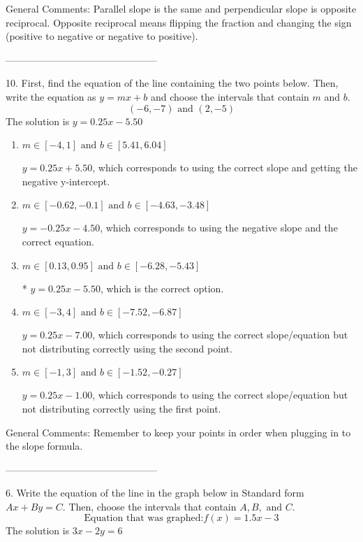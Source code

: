\documentclass{article}[14pt]
\begin{document}
General Comments: Parallel slope is the same and perpendicular slope is opposite reciprocal. Opposite reciprocal means flipping the fraction and changing the sign (positive to negative or negative to positive).

-----------------------------------------------

10. First, find the equation of the line containing the two points below. Then, write the equation as $ y=mx+b $ and choose the intervals that contain $m$ and $b$.
$$ (-6, -7) \text{ and } (2, -5) $$ 
The solution is $ y = 0.25x - 5.50 $ 

\begin{enumerate}[label=\Alph*.] 
\item $ m \in [-4, 1] \text{ and } b \in [5.41, 6.04] $ 

  $y = 0.25x + 5.50$, which corresponds to using the correct slope and getting the negative y-intercept. 
\item $ m \in [-0.62, -0.1] \text{ and } b \in [-4.63, -3.48] $ 

  $y = -0.25x - 4.50$, which corresponds to using the negative slope and the correct equation. 
\item $ m \in [0.13, 0.95] \text{ and } b \in [-6.28, -5.43] $ 

 * $y = 0.25x - 5.50$, which is the correct option. 
\item $ m \in [-3, 4] \text{ and } b \in [-7.52, -6.87] $ 

  $y = 0.25x - 7.00$, which corresponds to using the correct slope/equation but not distributing correctly using the second point. 
\item $ m \in [-1, 3] \text{ and } b \in [-1.52, -0.27] $ 

  $y = 0.25x - 1.00$, which corresponds to using the correct slope/equation but not distributing correctly using the first point. 
\end{enumerate} 
 
General Comments: Remember to keep your points in order when plugging in to the slope formula.

-----------------------------------------------

6. Write the equation of the line in the graph below in Standard form $Ax+By=C$. Then, choose the intervals that contain $A, B, \text{ and } C$.
$$ \text{Equation that was graphed:} f(x)= 1.5 x - 3 $$ 
The solution is $ 3 x - 2 y = 6 $ 
\end{document}
